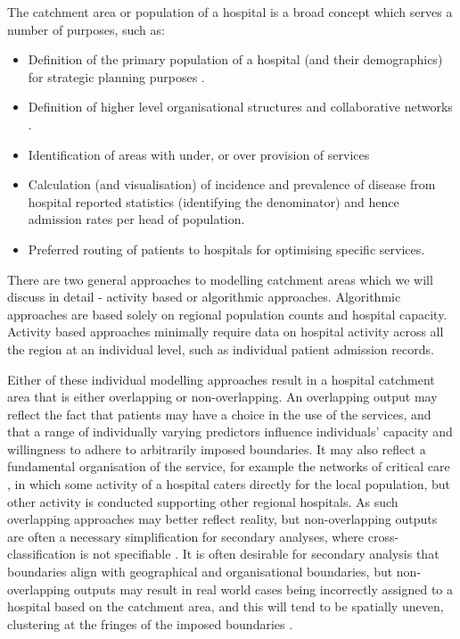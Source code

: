 \documentclass[twocolumn]{bmcart}%
\providecommand{\tightlist}{%
  \setlength{\itemsep}{0pt}\setlength{\parskip}{0pt}}
\begin{document}
The catchment area or population of a hospital is a broad concept which serves a number of purposes, such as: 


\begin{itemize}
\tightlist
\item
  Definition of the primary population of a hospital (and their demographics) for strategic planning purposes 
\cite{wangCatchmentAreaAnalysis2015}.
\item
  Definition of higher level organisational structures and collaborative networks 
\cite{clarkeDefiningHospitalCatchment2019}.
\item
  Identification of areas with under, or over provision of services
\item
  Calculation (and visualisation) of incidence and prevalence of disease from hospital reported statistics (identifying 
the denominator) \cite{gilmourIdentificationHospitalCatchment2010} and hence admission rates per head of population.
\item
  Preferred routing of patients to hospitals for optimising specific
  services.
\end{itemize}

There are two general approaches to modelling catchment areas which we will discuss in detail - activity based or 
algorithmic approaches. Algorithmic approaches are based solely on regional population counts and hospital capacity. 
Activity based approaches minimally require data on hospital activity across all the region at an individual level, 
such as individual patient admission records. 

Either of these individual modelling approaches result in a hospital catchment area that is either overlapping or 
non-overlapping. An overlapping output may reflect the fact that patients may have a choice in the use of the services, 
and that a range of individually varying predictors influence individuals' capacity and willingness to adhere to 
arbitrarily imposed boundaries. It may also reflect a fundamental organisation of the service, for example the networks 
of critical care \cite{pettCriticalCareTransfers2020}, in which some activity of a hospital caters directly for the 
local population, but other activity is conducted supporting other regional hospitals. As such overlapping approaches 
may better reflect reality, but non-overlapping outputs are often a necessary simplification for secondary analyses, 
where cross-classification is not specifiable \cite{jonesEthnicResidentialSegregation2015}. It is often desirable for 
secondary analysis that boundaries align with geographical and organisational boundaries, but non-overlapping outputs 
may result in real world cases being incorrectly assigned to a hospital based on the catchment area, and this will tend 
to be spatially uneven, clustering at the fringes of the imposed boundaries \cite{arcayaAreaVariationsHealth2012}.
\end{document}
